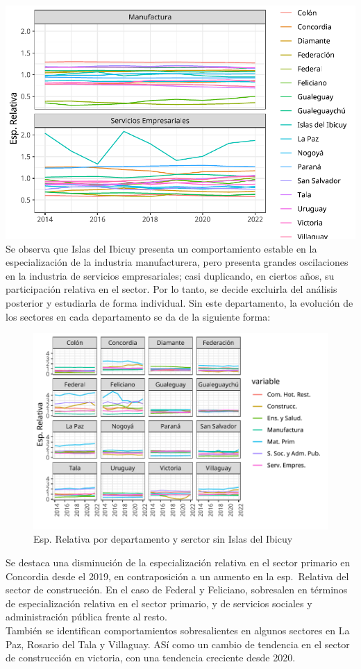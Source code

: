 \documentclass[
]{article}
\begin{document}
\includegraphics{documento-final_files/figure-latex/unnamed-chunk-1-1.pdf}
Se observa que Islas del Ibicuy presenta un comportamiento estable en la
especialización de la industria manufacturera, pero presenta grandes
oscilaciones en la industria de servicios empresariales; casi
duplicando, en ciertos años, su participación relativa en el sector. Por
lo tanto, se decide excluirla del análisis posterior y estudiarla de
forma individual. Sin este departamento, la evolución de los sectores en
cada departamento se da de la siguiente forma:

\begin{figure}
\centering
\includegraphics{documento-final_files/figure-latex/unnamed-chunk-2-1.pdf}
\caption{Esp. Relativa por departamento y serctor sin Islas del Ibicuy}
\end{figure}

Se destaca una disminución de la especialización relativa en el sector
primario en Concordia desde el 2019, en contraposición a un aumento en
la esp.~Relativa del sector de construcción. En el caso de Federal y
Feliciano, sobresalen en términos de especialización relativa en el
sector primario, y de servicios sociales y administración pública frente
al resto.\\
También se identifican comportamientos sobresalientes en algunos
sectores en La Paz, Rosario del Tala y Villaguay. ASí como un cambio de
tendencia en el sector de construcción en victoria, con una tendencia
creciente desde 2020.
\end{document}
